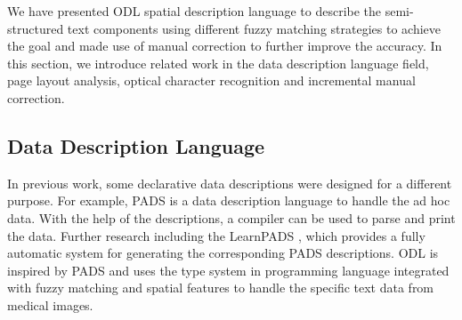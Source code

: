 We have presented ODL spatial description language to describe the 
semi-structured text components using different fuzzy matching 
strategies to achieve the goal and made use of manual correction 
to further improve the accuracy. 
In this section, we introduce related 
work in the data description language field, page layout analysis, 
optical character recognition and incremental manual correction. 

\subsection{Data Description Language}
In previous work, some declarative data 
descriptions were designed for a different purpose. For example, 
PADS \cite{fisher+:pads} is a data description language to 
handle the ad hoc data. 
With the help of the descriptions, a compiler can be 
used to parse and print the data. Further research including 
the LearnPADS \cite{Fisher:2008:DSF,fisher2008learnpads}, 
which provides a fully automatic 
system for generating the corresponding PADS descriptions. 
ODL is inspired by PADS and uses the type system in programming 
language integrated with fuzzy matching and spatial features 
to handle the specific text data from medical images. 

